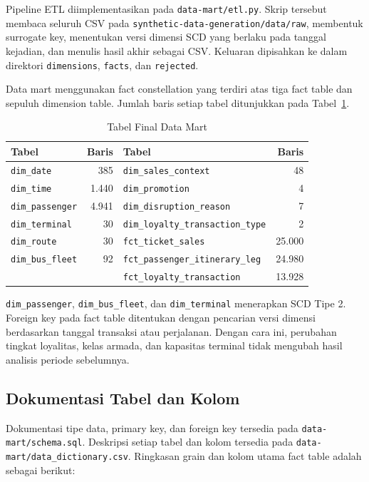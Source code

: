 Pipeline ETL diimplementasikan pada \texttt{data-mart/etl.py}. Skrip tersebut
membaca seluruh CSV pada \texttt{synthetic-data-generation/data/raw}, membentuk
surrogate key, menentukan versi dimensi SCD yang berlaku pada tanggal kejadian,
dan menulis hasil akhir sebagai CSV. Keluaran dipisahkan ke dalam direktori
\texttt{dimensions}, \texttt{facts}, dan \texttt{rejected}.

Data mart menggunakan fact constellation yang terdiri atas tiga fact table dan
sepuluh dimension table. Jumlah baris setiap tabel ditunjukkan pada
Tabel~\ref{tab:tabel-final-data-mart}.

\begin{table}[htbp]
\centering
\small
\caption{Tabel Final Data Mart}
\label{tab:tabel-final-data-mart}
\begin{tabular}{|l|r|l|r|}
\hline
\textbf{Tabel} & \textbf{Baris} & \textbf{Tabel} & \textbf{Baris} \\
\hline
\texttt{dim\_date} & 385 & \texttt{dim\_sales\_context} & 48 \\
\texttt{dim\_time} & 1.440 & \texttt{dim\_promotion} & 4 \\
\texttt{dim\_passenger} & 4.941 & \texttt{dim\_disruption\_reason} & 7 \\
\texttt{dim\_terminal} & 30 & \texttt{dim\_loyalty\_transaction\_type} & 2 \\
\texttt{dim\_route} & 30 & \texttt{fct\_ticket\_sales} & 25.000 \\
\texttt{dim\_bus\_fleet} & 92 & \texttt{fct\_passenger\_itinerary\_leg} & 24.980 \\
& & \texttt{fct\_loyalty\_transaction} & 13.928 \\
\hline
\end{tabular}
\end{table}

\texttt{dim\_passenger}, \texttt{dim\_bus\_fleet}, dan
\texttt{dim\_terminal} menerapkan SCD Tipe 2. Foreign key pada fact table
ditentukan dengan pencarian versi dimensi berdasarkan tanggal transaksi atau
perjalanan. Dengan cara ini, perubahan tingkat loyalitas, kelas armada, dan
kapasitas terminal tidak mengubah hasil analisis periode sebelumnya.

\subsection{Dokumentasi Tabel dan Kolom}

Dokumentasi tipe data, primary key, dan foreign key tersedia pada
\texttt{data-mart/schema.sql}. Deskripsi setiap tabel dan kolom tersedia pada
\texttt{data-mart/data\_dictionary.csv}. Ringkasan grain dan kolom utama fact
table adalah sebagai berikut:

